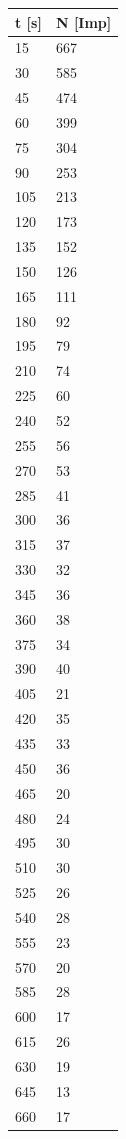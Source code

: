 \begin{minipage}{\linewidth}
    \begin{table}[H]
        \centering
    
    \begin{tabular}{ll}
        \toprule
        t [s] & N [Imp] \\
        \midrule
        15 &	 667 \\
        30 &	 585 \\ 
        45 &	 474 \\
        60 &	 399 \\
        75 &	 304 \\
        90 &	 253 \\
        105	&    213 \\
        120	&    173 \\
        135	&    152 \\
        150	&    126 \\
        165	&    111 \\
        180	&     92 \\
        195	&     79 \\
        210	&     74 \\
        225	&     60 \\
        240	&     52 \\
        255	&     56 \\
        270	&     53 \\
        285	&     41 \\
        300	&     36 \\
        315	&     37 \\
        330	&     32 \\
        345	&     36 \\
        360	&     38 \\
        375	&     34 \\
        390	&     40 \\
        405	&     21 \\
        420	&     35 \\
        435	&     33 \\
        450	&     36 \\
        465	&     20 \\
        480	&     24 \\
        495	&     30 \\
        510	&     30 \\
        525	&     26 \\
        540	&     28 \\
        555	&     23 \\
        570	&     20 \\
        585	&     28 \\
        600	&     17 \\
        615	&     26 \\
        630	&     19 \\
        645	&     13 \\
        660	&     17 \\
        \bottomrule
        

\end{tabular}
\end{table}
\end{minipage}
